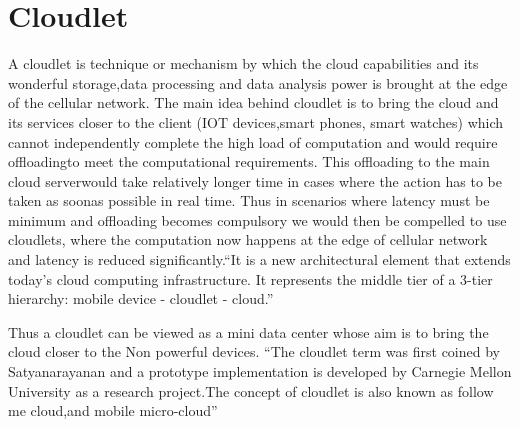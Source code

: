 \section{Cloudlet}


A cloudlet is technique or mechanism by which the cloud capabilities
and its wonderful storage,data processing and data analysis power is
brought at the edge of the cellular network.  The main idea behind
cloudlet is to bring the cloud and its services closer to the
client (IOT devices,smart phones, smart watches) which cannot
independently complete the high load of computation and would require
offloadingto meet the computational requirements. This offloading to
the main cloud serverwould take relatively longer time in cases where
the action has to be taken as soonas possible in real time. Thus in
scenarios where latency must be minimum and offloading becomes
compulsory we would then be compelled to use cloudlets, where the
computation now happens at the edge of cellular network and latency is
reduced significantly.``It is a new architectural element that extends
today's cloud computing infrastructure.  It represents the middle tier
of a 3-tier hierarchy: mobile device - cloudlet -
cloud.''~\cite{hid-sp18-410-wikiCloudlet}

Thus a cloudlet can be viewed as a mini data center whose aim is to
bring the cloud closer to the Non powerful devices. ``The cloudlet
term was first coined by Satyanarayanan and a prototype implementation
is developed by Carnegie Mellon University as a research project.The
concept of cloudlet is also known as follow me cloud,and mobile
micro-cloud''~\cite{hid-sp18-410-wikiCloudlet}
